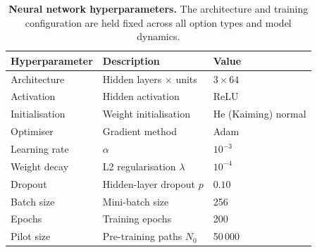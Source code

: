 \begin{table}[H]
  \centering
  \caption{%
    \textbf{Neural network hyperparameters.}
    The architecture and training configuration are held fixed
    across all option types and model dynamics.%
  }
  \label{tab:params-nn}
  \begin{tabular}{lll}
    \toprule
    Hyperparameter & Description & Value \\
    \midrule
    Architecture   & Hidden layers $\times$ units & $3 \times 64$ \\
    Activation     & Hidden activation             & ReLU \\
    Initialisation & Weight initialisation         & He (Kaiming) normal \\
    Optimiser      & Gradient method               & Adam \\
    Learning rate  & $\alpha$                      & $10^{-3}$ \\
    Weight decay   & L2 regularisation $\lambda$   & $10^{-4}$ \\
    Dropout        & Hidden-layer dropout $p$      & $0.10$ \\
    Batch size     & Mini-batch size               & 256 \\
    Epochs         & Training epochs               & 200 \\
    Pilot size     & Pre-training paths $N_0$      & 50\,000 \\
    \bottomrule
  \end{tabular}
\end{table}